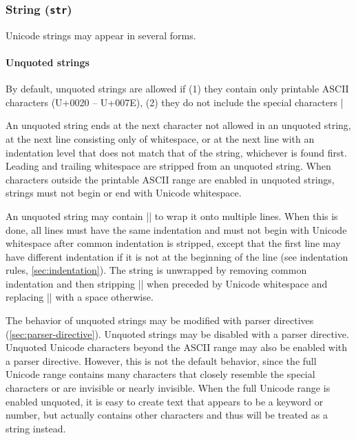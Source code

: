 \documentclass[11pt]{article}
\begin{document}
\subsubsection{String (\texttt{str})}

Unicode strings may appear in several forms.

\paragraph{Unquoted strings}

By default, unquoted strings are allowed if (1) they contain only printable ASCII characters (U+0020 -- U+007E), (2) they do not include the special characters |%

An unquoted string ends at the next character not allowed in an unquoted string, at the next line consisting only of whitespace, or at the next line with an indentation level that does not match that of the string, whichever is found first.  Leading and trailing whitespace are stripped from an unquoted string.  When characters outside the printable ASCII range are enabled in unquoted strings, strings must not begin or end with Unicode whitespace.

An unquoted string may contain |\n| to wrap it onto multiple lines.  When this is done, all lines must have the same indentation and must not begin with Unicode whitespace after common indentation is stripped, except that the first line may have different indentation if it is not at the beginning of the line (see indentation rules, \cref{sec:indentation}).  The string is unwrapped by removing common indentation and then stripping |\n| when preceded by Unicode whitespace and replacing |\n| with a space otherwise.

The behavior of unquoted strings may be modified with parser directives (\cref{sec:parser-directive}).  Unquoted strings may be disabled with a parser directive.  Unquoted Unicode characters beyond the ASCII range may also be enabled with a parser directive.  However, this is not the default behavior, since the full Unicode range contains many characters that closely resemble the special characters or are invisible or nearly invisible.  When the full Unicode range is enabled unquoted, it is easy to create text that appears to be a keyword or number, but actually contains other characters and thus will be treated as a string instead.
\end{document}
